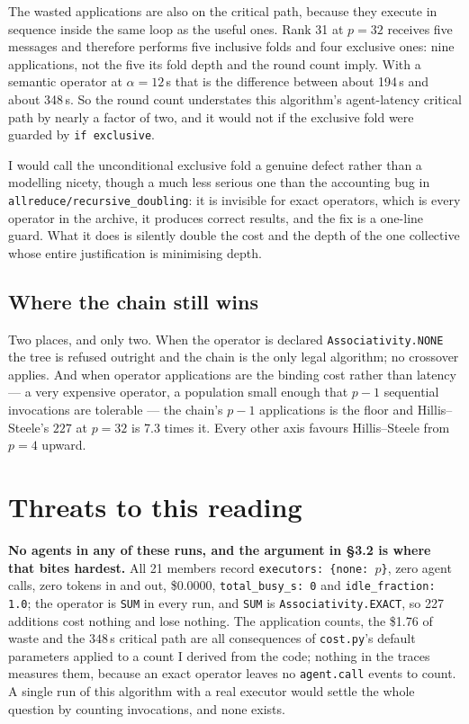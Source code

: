 \documentclass[11pt]{article}
\begin{document}
The wasted applications are also on the critical path, because they execute in sequence inside the
same loop as the useful ones. Rank 31 at $p=32$ receives five messages and therefore performs five
inclusive folds and four exclusive ones: nine applications, not the five its fold depth and the
round count imply. With a semantic operator at $\alpha = 12$\,s that is the difference between
about 194\,s and about 348\,s. So the round count understates this algorithm's agent-latency
critical path by nearly a factor of two, and it would not if the exclusive fold were guarded by
\texttt{if exclusive}.

I would call the unconditional exclusive fold a genuine defect rather than a modelling nicety,
though a much less serious one than the accounting bug in
\texttt{allreduce/recursive\_doubling}: it is invisible for exact operators, which is every
operator in the archive, it produces correct results, and the fix is a one-line guard. What it
does is silently double the cost and the depth of the one collective whose entire justification is
minimising depth.

\subsection{Where the chain still wins}

Two places, and only two. When the operator is declared \texttt{Associativity.NONE} the tree is
refused outright and the chain is the only legal algorithm; no crossover applies. And when
operator applications are the binding cost rather than latency --- a very expensive operator, a
population small enough that $p-1$ sequential invocations are tolerable --- the chain's $p-1$
applications is the floor and Hillis--Steele's $227$ at $p=32$ is 7.3 times it. Every other axis
favours Hillis--Steele from $p=4$ upward.

\section{Threats to this reading}

\textbf{No agents in any of these runs, and the argument in \S3.2 is where that bites hardest.}
All 21 members record \texttt{executors: \{none: $p$\}}, zero agent calls, zero tokens in and out,
\$0.0000, \texttt{total\_busy\_s: 0} and \texttt{idle\_fraction: 1.0}; the operator is
\texttt{SUM} in every run, and \texttt{SUM} is \texttt{Associativity.EXACT}, so 227 additions cost
nothing and lose nothing. The application counts, the \$1.76 of waste and the $348$\,s critical
path are all consequences of \texttt{cost.py}'s default parameters applied to a count I derived
from the code; nothing in the traces measures them, because an exact operator leaves no
\texttt{agent.call} events to count. A single run of this algorithm with a real executor would
settle the whole question by counting invocations, and none exists.
\end{document}
